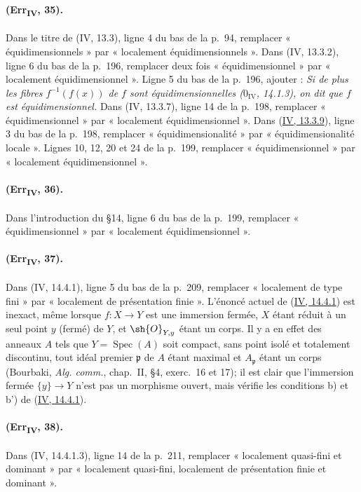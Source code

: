 \paragraph{(Err\textsubscript{IV}, 35).}
Dans le titre de (IV, 13.3), ligne 4 du bas de la p.~94, remplacer
« équidimensionnels » par « localement équidimensionnels ». Dans
(IV, 13.3.2), ligne 6 du bas de la p.~196, remplacer deux fois
« équidimensionnel » par « localement équidimensionnel ». Ligne 5 du bas
de la p.~196, ajouter : \emph{Si de plus les fibres $f^{-1}(f(x))$ de
$f$ sont équidimensionnelles ($0_{\mathrm{IV}}$, 14.1.3), on dit que
$f$ est équidimensionnel.} Dans (IV, 13.3.7), ligne 14 de la p.~198,
remplacer « équidimensionnel » par « localement équidimensionnel ».
Dans ({\hyperref[canon-index.ega4.c04.statement.13-3-9]{IV, 13.3.9}}), ligne 3 du
bas de la p.~198, remplacer « équidimensionalité » par
« équidimensionalité locale ». Lignes 10, 12, 20 et 24 de la p.~199,
remplacer « équidimensionnel » par « localement équidimensionnel ».

\paragraph{(Err\textsubscript{IV}, 36).}
Dans l'introduction du \S14, ligne 6 du bas de la p.~199, remplacer
« équidimensionnel » par « localement équidimensionnel ».

\paragraph{(Err\textsubscript{IV}, 37).}
Dans (IV, 14.4.1), ligne 5 du bas de la p.~209, remplacer « localement
de type fini » par « localement de présentation finie ». L'énoncé
actuel de ({\hyperref[canon-index.ega4.c04.thm.14-4-1]{IV, 14.4.1}}) est inexact,
même lorsque $f:X\to Y$ est une immersion fermée, $X$ étant réduit à
un seul point $y$ (fermé) de $Y$, et $\sh{O}_{Y,y}$ étant un corps. Il
y a en effet des anneaux $A$ tels que $Y=\operatorname{Spec}(A)$ soit
compact, sans point isolé et totalement discontinu, tout idéal premier
$\mathfrak p$ de $A$ étant maximal et $A_\mathfrak p$ étant un corps
(Bourbaki, \emph{Alg. comm.}, chap.~II, \S4, exerc.~16 et 17); il est
clair que l'immersion fermée $\{y\}\to Y$ n'est pas un morphisme
ouvert, mais vérifie les conditions b) et b') de
({\hyperref[canon-index.ega4.c04.thm.14-4-1]{IV, 14.4.1}}).

\paragraph{(Err\textsubscript{IV}, 38).}
Dans (IV, 14.4.1.3), ligne 14 de la p.~211, remplacer « localement
quasi-fini et dominant » par « localement quasi-fini, localement de
présentation finie et dominant ».

